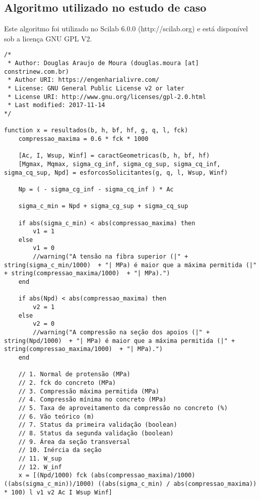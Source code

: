 \documentclass[
	12pt,				%
	openright,			%
	oneside,			%
	a4paper,			%
	chapter=TITLE,		%
	english,			%
	french,				%
	spanish,			%
	brazil				%
	]{abntex2}
\begin{document}

\begin{apendicesenv}

\partapendices

\chapter{Algoritmo utilizado no estudo de caso}
\label{script}

Este algoritmo foi utilizado no Scilab 6.0.0 (http://scilab.org) e está disponível sob a licença GNU GPL V2.

%
\begin{lstlisting}
/*
 * Author: Douglas Araujo de Moura (douglas.moura [at] constrinew.com.br)
 * Author URI: https://engenharialivre.com/
 * License: GNU General Public License v2 or later
 * License URI: http://www.gnu.org/licenses/gpl-2.0.html
 * Last modified: 2017-11-14
*/

function x = resultados(b, h, bf, hf, g, q, l, fck)
    compressao_maxima = 0.6 * fck * 1000

    [Ac, I, Wsup, Winf] = caractGeometricas(b, h, bf, hf)
    [Mgmax, Mqmax, sigma_cg_inf, sigma_cg_sup, sigma_cq_inf, sigma_cq_sup, Npd] = esforcosSolicitantes(g, q, l, Wsup, Winf)

    Np = ( - sigma_cg_inf - sigma_cq_inf ) * Ac

    sigma_c_min = Npd + sigma_cg_sup + sigma_cq_sup

    if abs(sigma_c_min) < abs(compressao_maxima) then
        v1 = 1
    else
        v1 = 0
        //warning("A tensão na fibra superior (|" + string(sigma_c_min/1000)  + "| MPa) é maior que a máxima permitida (|" + string(compressao_maxima/1000)  + "| MPa).")
    end

    if abs(Npd) < abs(compressao_maxima) then
        v2 = 1
    else
        v2 = 0
        //warning("A compressão na seção dos apoios (|" + string(Npd/1000)  + "| MPa) é maior que a máxima permitida (|" + string(compressao_maxima/1000)  + "| MPa).")
    end

    // 1. Normal de protensão (MPa)
    // 2. fck do concreto (MPa)
    // 3. Compressão máxima permitida (MPa)
    // 4. Compressão mínima no concreto (MPa)
    // 5. Taxa de aproveitamento da compressão no concreto (%)
    // 6. Vão teórico (m)
    // 7. Status da primeira validação (boolean)
    // 8. Status da segunda validação (boolean)
    // 9. Área da seção transversal
    // 10. Inércia da seção
    // 11. W_sup
    // 12. W_inf
    x = [(Npd/1000) fck (abs(compressao_maxima)/1000) ((abs(sigma_c_min))/1000) ((abs(sigma_c_min) / abs(compressao_maxima)) * 100) l v1 v2 Ac I Wsup Winf]


\end{lstlisting}
\end{apendicesenv}
\end{document}
